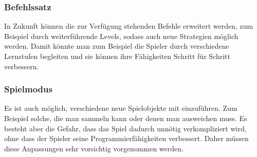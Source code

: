 \documentclass[11pt,a4paper,titlepage]{article}
\begin{document}
\subsubsection{Befehlssatz}
In Zukunft können die zur Verfügung stehenden Befehle erweitert werden, zum Beispiel durch weiterführende Levels, sodass auch neue Strategien möglich werden. Damit könnte man zum Beispiel die Spieler durch verschiedene Lernstufen begleiten und sie können ihre Fähigkeiten Schritt für Schritt verbessern.

\subsubsection{Spielmodus}
Es ist auch möglich, verschiedene neue Spielobjekte mit einzuführen. Zum Beispiel solche, die man sammeln kann oder denen man ausweichen muss. Es besteht aber die Gefahr, dass das Spiel dadurch unnötig verkompliziert wird, ohne dass der Spieler seine Programmierfähigkeiten verbessert. Daher müssen diese Anpassungen sehr vorsichtig vorgenommen werden.

\newpage



\begin{otherlanguage}{german}
\printbibliography
\end{otherlanguage}

\begin{otherlanguage}{german}
\listoffigures
\end{otherlanguage}
\end{document}

